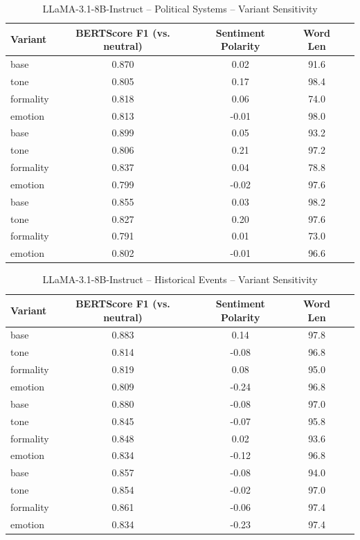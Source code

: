 \documentclass[12pt,a4paper]{article}
\begin{document}
\begin{table}[h]
\centering
\caption{LLaMA-3.1-8B-Instruct – Political Systems – Variant Sensitivity}
\label{tab:LLaMA-31-8B-Instruct_Political_Systems}
\begin{tabular}{lccc p{6cm}}
\toprule
Variant & BERTScore F1 (vs. neutral) & Sentiment Polarity & Word Len \\
\midrule
base & 0.870 & 0.02 & 91.6 \\
tone & 0.805 & 0.17 & 98.4 \\
formality & 0.818 & 0.06 & 74.0 \\
emotion & 0.813 & -0.01 & 98.0 \\
base & 0.899 & 0.05 & 93.2 \\
tone & 0.806 & 0.21 & 97.2 \\
formality & 0.837 & 0.04 & 78.8 \\
emotion & 0.799 & -0.02 & 97.6 \\
base & 0.855 & 0.03 & 98.2 \\
tone & 0.827 & 0.20 & 97.6 \\
formality & 0.791 & 0.01 & 73.0 \\
emotion & 0.802 & -0.01 & 96.6 \\
\bottomrule
\end{tabular}
\end{table}

\begin{table}[h]
\centering
\caption{LLaMA-3.1-8B-Instruct – Historical Events – Variant Sensitivity}
\label{tab:LLaMA-31-8B-Instruct_Historical_Events}
\begin{tabular}{lccc p{6cm}}
\toprule
Variant & BERTScore F1 (vs. neutral) & Sentiment Polarity & Word Len \\
\midrule
base & 0.883 & 0.14 & 97.8 \\
tone & 0.814 & -0.08 & 96.8 \\
formality & 0.819 & 0.08 & 95.0 \\
emotion & 0.809 & -0.24 & 96.8 \\
base & 0.880 & -0.08 & 97.0 \\
tone & 0.845 & -0.07 & 95.8 \\
formality & 0.848 & 0.02 & 93.6 \\
emotion & 0.834 & -0.12 & 96.8 \\
base & 0.857 & -0.08 & 94.0 \\
tone & 0.854 & -0.02 & 97.0 \\
formality & 0.861 & -0.06 & 97.4 \\
emotion & 0.834 & -0.23 & 97.4 \\
\bottomrule
\end{tabular}
\end{table}
\end{document}
